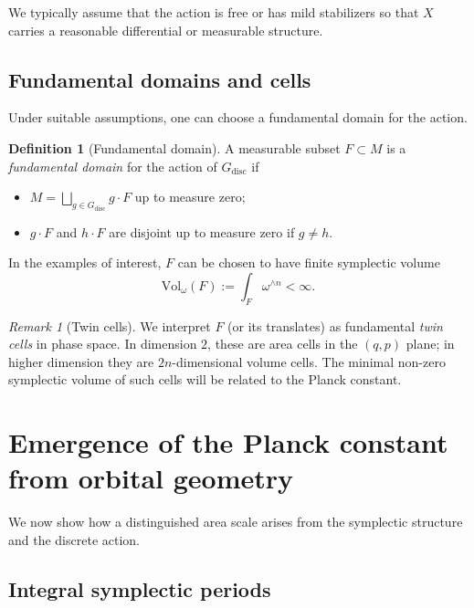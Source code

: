\documentclass[11pt]{article}
\numberwithin{equation}{section}
\theoremstyle{definition}
\newtheorem{definition}[theorem]{Definition}
\theoremstyle{remark}
\newtheorem{remark}[theorem]{Remark}
\newcommand{\Gdisc}{G_{\mathrm{disc}}}
\begin{document}
	We typically assume that the action is free or has mild stabilizers so
	that $X$ carries a reasonable differential or measurable structure.
	
	\subsection{Fundamental domains and cells}
	
	Under suitable assumptions, one can choose a fundamental domain for the
	action.
	
	\begin{definition}[Fundamental domain]
		A measurable subset $F\subset M$ is a \emph{fundamental domain} for the
		action of $\Gdisc$ if
		\begin{itemize}[leftmargin=2em]
			\item $M = \bigsqcup_{g\in\Gdisc} g\cdot F$ up to measure zero;
			\item $g\cdot F$ and $h\cdot F$ are disjoint up to measure zero if
			$g\neq h$.
		\end{itemize}
	\end{definition}
	
	In the examples of interest, $F$ can be chosen to have finite symplectic
	volume
	\[
	\mathrm{Vol}_\omega(F) := \int_F \omega^{\wedge n} < \infty.
	\]
	
	\begin{remark}[Twin cells]
		We interpret $F$ (or its translates) as fundamental \emph{twin cells}
		in phase space. In dimension $2$, these are area cells in the $(q,p)$
		plane; in higher dimension they are $2n$-dimensional volume cells.
		The minimal non-zero symplectic volume of such cells will be related to
		the Planck constant.
	\end{remark}
	
	
	\section{Emergence of the Planck constant from orbital geometry}
	\label{sec:hbar}
	
	We now show how a distinguished area scale arises from the symplectic
	structure and the discrete action.
	
	\subsection{Integral symplectic periods}
	
\end{document}
